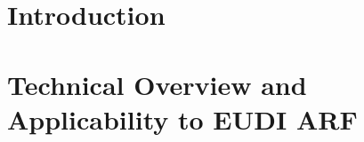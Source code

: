 \documentclass{article}
\newcommand{\jbel}[1]{{\color{blue}{}jbel: #1}}
\newcommand{\ndhy}[2]{{\color{blue}{}ndhy: #2}}
\begin{document}
\clearpage
\tableofcontents

\clearpage
\section{Introduction}
\label{sec:introduction}
%


\section{Technical Overview and Applicability to EUDI ARF}
\label{sec:appeudi}





% 
\end{document}
